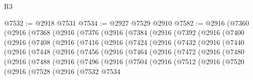 \begin{lexlean}{R3}
\begin{coremodule}
@7532 := @2918 @7531
@7534 := @2927 @7529 @2910
@7582 := @2916
    (@7360
      (@2916
        (@7368
          (@2916
            (@7376
              (@2916
                (@7384
                  (@2916
                    (@7392
                      (@2916
                        (@7400
                          (@2916
                            (@7408
                              (@2916
                                (@7416
                                  (@2916
                                    (@7424
                                      (@2916
                                        (@7432
                                          (@2916
                                            (@7440
                                              (@2916
                                                (@7448
                                                  (@2916
                                                    (@7456
                                                      (@2916
                                                        (@7464
                                                          (@2916
                                                            (@7472
                                                              (@2916
                                                                (@7480
                                                                  (@2916
                                                                    (@7488
                                                                      (@2916
                                                                        (@7496
                                                                          (@2916
                                                                            (@7504
                                                                              (@2916
                                                                                (@7512
                                                                                  (@2916
                                                                                    (@7520
                                                                                      (@2916
                                                                                        (@7528
                                                                                          (@2916
                                                                                            (@7532
                                                                                              @7534

\end{coremodule}
\end{lexlean}
